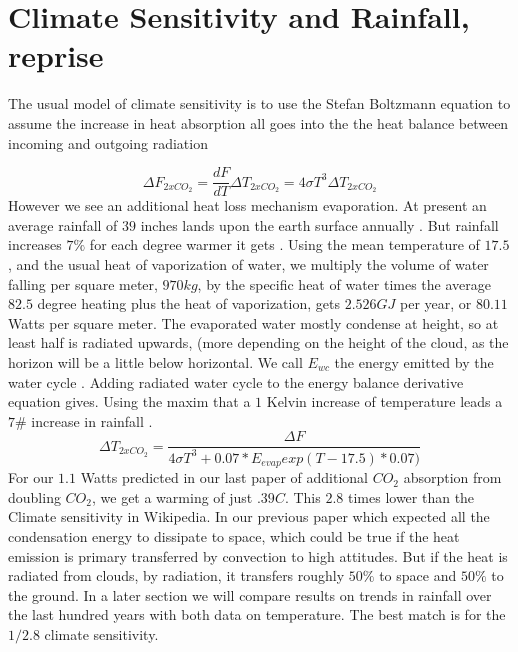 \documentclass{book}
\begin{document}
	\section{Climate Sensitivity and Rainfall, reprise}
	
	The usual model of climate sensitivity is to use the Stefan Boltzmann equation to assume the increase in heat absorption all goes into the the heat balance between incoming and outgoing radiation \cite{wikisense}
	
	\begin{equation}
		\Delta F_{2xCO_2} = \frac{dF}{dT} \Delta T_{2xCO_2}  = 4\sigma T^3 \Delta T_{2xCO_2} 
	\end{equation}
	However we see an additional heat loss mechanism evaporation. At present an average rainfall of $39$ inches lands upon the earth surface annually \cite{rainfall}. But rainfall increases $7\%$ for each degree warmer it gets \cite{rainrise}.
	Using the mean temperature of $17.5$, and the usual heat of vaporization of water, we multiply the volume of water falling per square meter, $970kg$, by the specific heat of water times the average $82.5$ degree heating plus the heat of vaporization, gets $2.526GJ$ per year, or $80.11$ Watts per square meter. The evaporated water mostly condense at height, so at least half is radiated upwards, (more depending on the height of the cloud, as the horizon will be a little below horizontal. We call $E_{wc}$ the energy emitted by the water cycle . Adding radiated water cycle to the energy balance derivative equation gives. Using the maxim that a $1$ Kelvin increase of temperature leads a $7\#$ increase in rainfall \cite{rainrise}. 	
		\begin{equation}
		\Delta T_{2xCO_2} = \frac{ \Delta F}{ 4\sigma T^3 + 0.07 * E_{evap} exp( T-17.5)*0.07)}
	\end{equation}
	For our $1.1$ Watts predicted in our last paper \cite{Adams1} of additional $CO_2$ absorption from doubling $CO_2$, we get a warming of just $.39 C$. This $2.8$ times lower than the \cite{wikisense} Climate sensitivity in Wikipedia. In our previous paper \cite{Adams1} which expected all the condensation energy to dissipate to space, which could be true if the heat emission is primary transferred by convection to high attitudes. But if the heat is radiated from clouds, by radiation, it transfers roughly $50\%$ to space and $50\%$ to the ground. In a later section we will compare results on trends in rainfall over the last hundred years with both data on temperature. The best match is for the $1/2.8$ climate sensitivity.
	
\end{document}
